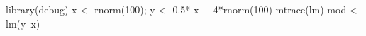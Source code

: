 \begin{Schunk}
\begin{Sinput}
 library(debug)
 x <- rnorm(100); y <- 0.5* x + 4*rnorm(100)
 mtrace(lm)
 mod <- lm(y~x)
\end{Sinput}
\end{Schunk}
